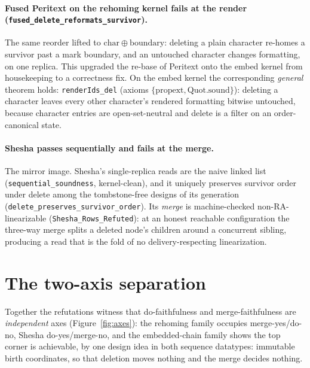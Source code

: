 \documentclass[11pt]{article}
\newcommand{\code}[1]{\texttt{#1}}
\begin{document}
\paragraph{Fused Peritext on the rehoming kernel fails at the render
(\code{fused\_delete\_reformats\_survivor}).}
The same reorder lifted to $\mathrm{char} \oplus \mathrm{boundary}$:
deleting a plain character re-homes a survivor past a mark boundary,
and an untouched character changes formatting, on one replica. This
upgraded the re-base of Peritext onto the embed kernel from
housekeeping to a correctness fix. On the embed kernel the
corresponding \emph{general} theorem holds: \code{renderIds\_del}
(axioms $\{\mathrm{propext}, \mathrm{Quot.sound}\}$): deleting a
character leaves every other character's rendered formatting bitwise
untouched, because character entries are open-set-neutral and delete
is a filter on an order-canonical state.

\paragraph{Shesha passes sequentially and fails at the merge.}
The mirror image. Shesha's single-replica reads are the naive linked
list (\code{sequential\_soundness}, kernel-clean), and it uniquely
preserves survivor order under delete among the tombstone-free designs
of its generation (\code{delete\_preserves\_survivor\_order}). Its
\emph{merge} is machine-checked non-RA-linearizable
(\code{Shesha\_Rows\_Refuted}): at an honest reachable configuration
the three-way merge splits a deleted node's children around a
concurrent sibling, producing a read that is the fold of no
delivery-respecting linearization.

\section{The two-axis separation}
\label{sec:axes}

Together the refutations witness that do-faithfulness and
merge-faithfulness are \emph{independent} axes
(Figure~\ref{fig:axes}): the rehoming family occupies
merge-yes/do-no, Shesha do-yes/merge-no, and the embedded-chain family
shows the top corner is achievable, by one design idea in both
sequence datatypes: immutable birth coordinates, so that deletion
moves nothing and the merge decides nothing.
\end{document}
